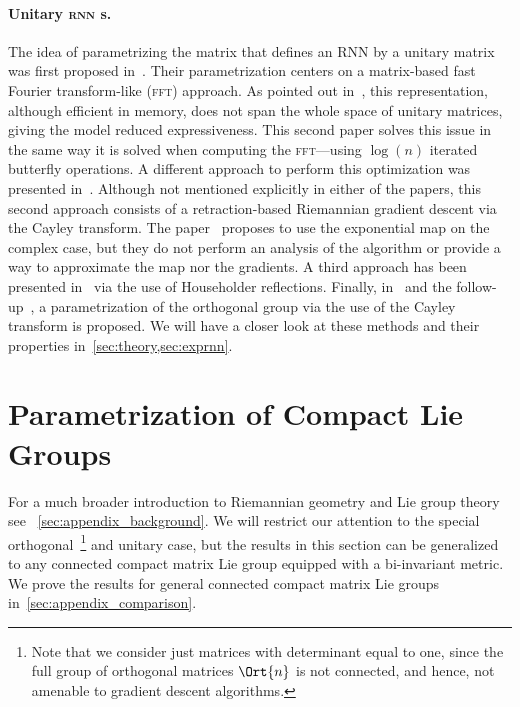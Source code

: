 \paragraph{Unitary \textsc{rnn} s.} The idea of parametrizing the matrix that defines an RNN by a unitary matrix was first proposed in~\cite{arjovsky2016unitary}. Their parametrization centers on a matrix-based fast Fourier transform-like (\textsc{fft}) approach. As pointed out in~\cite{jing2017tunable}, this representation, although efficient in memory, does not span the whole space of unitary matrices, giving the model reduced expressiveness. This second paper solves this issue in the same way it is solved when computing the \textsc{fft}---using $\log(n)$ iterated butterfly operations. A different approach to perform this optimization was presented in~\cite{wisdom2016full,vorontsov2017orthogonality}. Although not mentioned explicitly in either of the papers, this second approach consists of a retraction-based Riemannian gradient descent via the Cayley transform. The paper~\cite{hyland2017learning} proposes to use the exponential map on the complex case, but they do not perform an analysis of the algorithm or provide a way to approximate the map nor the gradients. A third approach has been presented in~\cite{mhammedi2017efficient} via the use of Householder reflections. Finally, in~\cite{helfrich18a} and the follow-up~\cite{maduranga2018complexur}, a parametrization of the orthogonal group via the use of the Cayley transform is proposed. We will have a closer look at these methods and their properties in~\ref{sec:theory,sec:exprnn}.

\section{Parametrization of Compact Lie Groups}\label{sec:theory}
For a much broader introduction to Riemannian geometry and Lie group theory see ~\ref{sec:appendix_background}. We will restrict our attention to the special orthogonal~\footnote{Note that we consider just matrices with determinant equal to one, since the full group of orthogonal matrices $\Ort{n}$ is not connected, and hence, not amenable to gradient descent algorithms.} and unitary case, but the results in this section can be generalized to any connected compact matrix Lie group equipped with a bi-invariant metric. We prove the results for general connected compact matrix Lie groups in~\ref{sec:appendix_comparison}.

